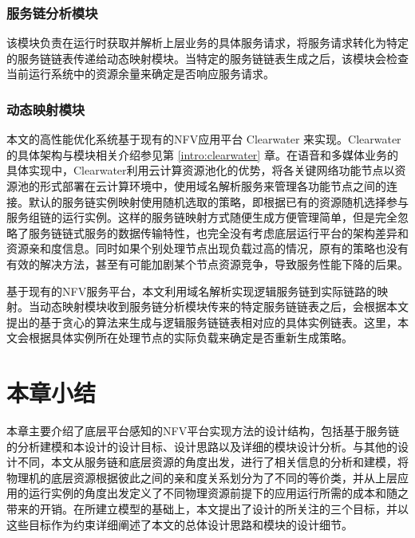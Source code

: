 \subsubsection{服务链分析模块}
该模块负责在运行时获取并解析上层业务的具体服务请求，将服务请求转化为特定的服务链链表传递给动态映射模块。当特定的服务链链表生成之后，该模块会检查当前运行系统中的资源余量来确定是否响应服务请求。


\subsubsection{动态映射模块}
本文的高性能优化系统基于现有的NFV应用平台 Clearwater 来实现。Clearwater的具体架构与模块相关介绍参见第 \ref{intro:clearwater} 章。在语音和多媒体业务的具体实现中，Clearwater利用云计算资源池化的优势，将各关键网络功能节点以资源池的形式部署在云计算环境中，使用域名解析服务来管理各功能节点之间的连接。默认的服务链实例映射使用随机选取的策略，即根据已有的资源随机选择参与服务组链的运行实例。这样的服务链映射方式随便生成方便管理简单，但是完全忽略了服务链链式服务的数据传输特性，也完全没有考虑底层运行平台的架构差异和资源亲和度信息。同时如果个别处理节点出现负载过高的情况，原有的策略也没有有效的解决方法，甚至有可能加剧某个节点资源竞争，导致服务性能下降的后果。

基于现有的NFV服务平台，本文利用域名解析实现逻辑服务链到实际链路的映射。当动态映射模块收到服务链分析模块传来的特定服务链链表之后，会根据本文提出的基于贪心的算法来生成与逻辑服务链链表相对应的具体实例链表。这里，本文会根据具体实例所在处理节点的实际负载来确定是否重新生成策略。

\section{本章小结}
本章主要介绍了底层平台感知的NFV平台实现方法的设计结构，包括基于服务链的分析建模和本设计的设计目标、设计思路以及详细的模块设计分析。与其他的设计不同，本文从服务链和底层资源的角度出发，进行了相关信息的分析和建模，将物理机的底层资源根据彼此之间的亲和度关系划分为了不同的等价类，并从上层应用的运行实例的角度出发定义了不同物理资源前提下的应用运行所需的成本和随之带来的开销。在所建立模型的基础上，本文提出了设计的所关注的三个目标，并以这些目标作为约束详细阐述了本文的总体设计思路和模块的设计细节。